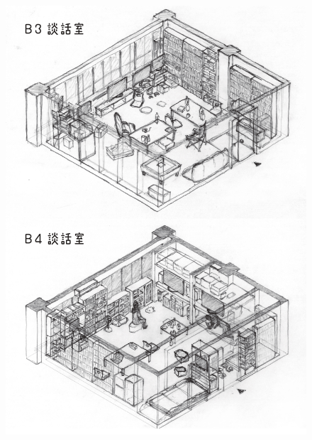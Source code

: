 \newpage
\begin{figure}[bh]
\vspace{10mm}
\centering
\includegraphics[]{gazo/談話室sketch_page-0004.jpg}
\end{figure}

